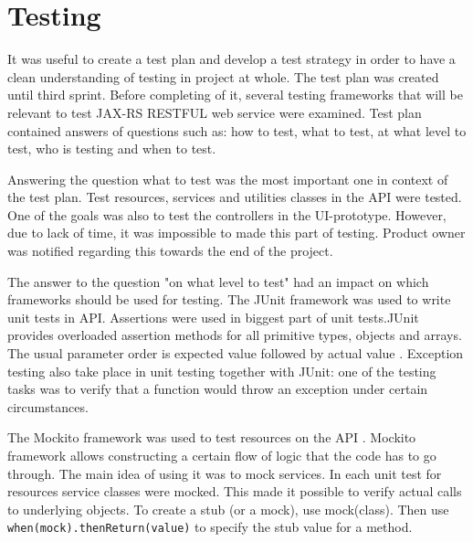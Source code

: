
\chapter{Testing}
\label{chap:testing}
% 

It was useful to create a test plan and develop a test strategy in order to have a clean understanding of testing in project at whole. The test plan was created until third sprint. Before completing of it, several testing frameworks  that will be relevant to test JAX-RS RESTFUL web service were examined. Test plan contained answers of questions such as: how to test, what to test, at what level to test, who is testing and when to test.

Answering the question what to test was the most important one in context of the test plan. Test resources, services and utilities classes in the API were tested. One of the goals was also to test the controllers in the UI-prototype. However, due to lack of time, it was impossible to made this part of testing. Product owner was notified regarding this towards the end of the project.

The answer to the question "on what level to test" had an impact on which frameworks should be used for testing. The JUnit framework  was used to write unit tests in API\cite{JUnit3:online}.
 Assertions were used in biggest part of unit tests.\textquotedbl JUnit provides overloaded assertion methods for all primitive types, objects and arrays. The usual parameter order is expected value followed by actual value\textquotedbl
 \cite{Asser18:online}.
Exception testing also take place in unit testing together with JUnit: one of the testing tasks was to verify that a function would throw an exception under certain circumstances.

The Mockito framework was used to test resources on the API \cite{mockitoRef}. Mockito framework allows constructing a certain flow of logic that the code has to go through. The main idea of using it was to mock services. In each unit test for resources service classes were mocked. This made it possible to verify actual calls to underlying objects. \textquotedbl To create a stub (or a mock), use mock(class). Then use \texttt{when(mock).thenReturn(value)} to specify the stub value for a method\textquotedbl \cite{Mocki40:online}.  

